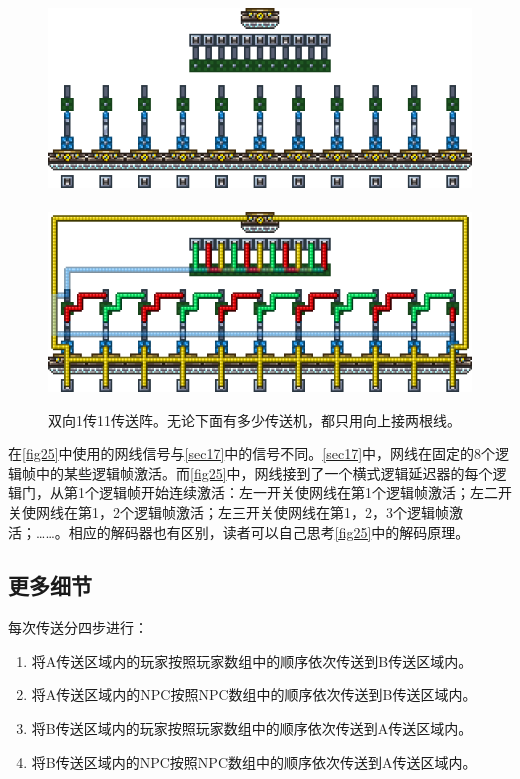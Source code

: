 \begin{figure}[!ht]
\centering
\includegraphics{images/389.png}\\
\mbox{}\\
\includegraphics{images/390.png}
\caption{双向1传11传送阵。无论下面有多少传送机，都只用向上接两根线。}\label{fig25}
\end{figure}

在\autoref{fig25}中使用的网线信号与\autoref{sec17}中的信号不同。\autoref{sec17}中，网线在固定的8个逻辑帧中的某些逻辑帧激活。而\autoref{fig25}中，网线接到了一个横式逻辑延迟器的每个逻辑门，从第1个逻辑帧开始连续激活：左一开关使网线在第1个逻辑帧激活；左二开关使网线在第1，2个逻辑帧激活；左三开关使网线在第1，2，3个逻辑帧激活；……。相应的解码器也有区别，读者可以自己思考\autoref{fig25}中的解码原理。

\subsection{更多细节}\label{sec9}
每次传送分四步进行：
\begin{enumerate}
\item 将A传送区域内的玩家按照玩家数组中的顺序依次传送到B传送区域内。
\item 将A传送区域内的NPC按照NPC数组中的顺序依次传送到B传送区域内。
\item 将B传送区域内的玩家按照玩家数组中的顺序依次传送到A传送区域内。
\item 将B传送区域内的NPC按照NPC数组中的顺序依次传送到A传送区域内。
\end{enumerate}

